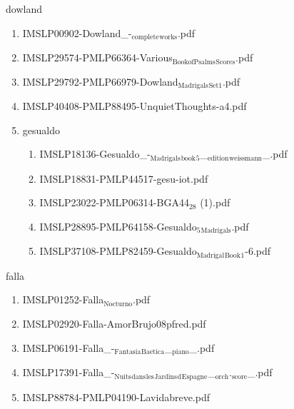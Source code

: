 \documentclass[11pt]{article}
\begin{document}
\item dowland
\label{sec-1-1-1-1-44-27}
\begin{enumerate}
\item IMSLP00902-Dowland\_-$_{\text{complete}}$$_{\text{works}}$.pdf
\label{sec-1-1-1-1-44-27-1}

\item IMSLP29574-PMLP66364-Various$_{\text{BookofPsalms}}$$_{\text{Scores}}$.pdf
\label{sec-1-1-1-1-44-27-2}

\item IMSLP29792-PMLP66979-Dowland$_{\text{Madrigals}}$$_{\text{Set1}}$.pdf
\label{sec-1-1-1-1-44-27-3}

\item IMSLP40408-PMLP88495-UnquietThoughts-a4.pdf
\label{sec-1-1-1-1-44-27-4}

\item gesualdo
\label{sec-1-1-1-1-44-27-5}
\begin{enumerate}
\item IMSLP18136-Gesualdo\_-$_{\text{Madrigals}}$$_{\text{book}}$$_{\text{5}}$\_$_{\text{edition}}$$_{\text{weissmann}}$\_.pdf
\label{sec-1-1-1-1-44-27-5-1}

\item IMSLP18831-PMLP44517-gesu-iot.pdf
\label{sec-1-1-1-1-44-27-5-2}

\item IMSLP23022-PMLP06314-BGA44$_{\text{28}}$ (1).pdf
\label{sec-1-1-1-1-44-27-5-3}

\item IMSLP28895-PMLP64158-Gesualdo$_{\text{5}}$$_{\text{Madrigals}}$.pdf
\label{sec-1-1-1-1-44-27-5-4}

\item IMSLP37108-PMLP82459-Gesualdo$_{\text{Madrigal}}$$_{\text{Book}}$$_{\text{1}}$-6.pdf
\label{sec-1-1-1-1-44-27-5-5}
\end{enumerate}
\end{enumerate}

\item falla
\label{sec-1-1-1-1-44-28}
\begin{enumerate}
\item IMSLP01252-Falla$_{\text{Nocturno}}$.pdf
\label{sec-1-1-1-1-44-28-1}

\item IMSLP02920-Falla-AmorBrujo08pfred.pdf
\label{sec-1-1-1-1-44-28-2}

\item IMSLP06191-Falla\_-$_{\text{Fantasia}}$$_{\text{Baetica}}$\_$_{\text{piano}}$\_.pdf
\label{sec-1-1-1-1-44-28-3}

\item IMSLP17391-Falla\_-$_{\text{Nuits}}$$_{\text{dans}}$$_{\text{les}}$$_{\text{Jardins}}$$_{\text{d}}$$_{\text{Espagne}}$\_$_{\text{orch}}$.$_{\text{score}}$\_.pdf
\label{sec-1-1-1-1-44-28-4}

\item IMSLP88784-PMLP04190-Lavidabreve.pdf
\label{sec-1-1-1-1-44-28-5}
\end{enumerate}
\end{document}
